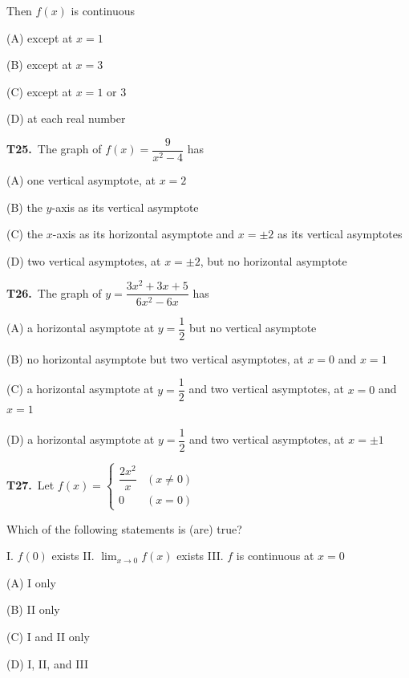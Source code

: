 \documentclass[11pt]{article}
\begin{document}
Then $f(x)$ is continuous
\begin{list}{}{\setlength{\leftmargin}{3em}\setlength{\labelwidth}{2.5em}\setlength{\itemsep}{0pt}\setlength{\topsep}{2pt}}
\item[(A)] except at $x = 1$
\item[(B)] except at $x = 3$
\item[(C)] except at $x = 1$ or $3$
\item[(D)] at each real number
\end{list}

\bigskip\noindent\textbf{T25.}\ The graph of $f(x) = \dfrac{9}{x^2-4}$ has
\begin{list}{}{\setlength{\leftmargin}{3em}\setlength{\labelwidth}{2.5em}\setlength{\itemsep}{0pt}\setlength{\topsep}{2pt}}
\item[(A)] one vertical asymptote, at $x = 2$
\item[(B)] the $y$-axis as its vertical asymptote
\item[(C)] the $x$-axis as its horizontal asymptote and $x = \pm 2$ as its vertical asymptotes
\item[(D)] two vertical asymptotes, at $x = \pm 2$, but no horizontal asymptote
\end{list}

\bigskip\noindent\textbf{T26.}\ The graph of $y = \dfrac{3x^2+3x+5}{6x^2-6x}$ has
\begin{list}{}{\setlength{\leftmargin}{3em}\setlength{\labelwidth}{2.5em}\setlength{\itemsep}{0pt}\setlength{\topsep}{2pt}}
\item[(A)] a horizontal asymptote at $y = \dfrac{1}{2}$ but no vertical asymptote
\item[(B)] no horizontal asymptote but two vertical asymptotes, at $x = 0$ and $x = 1$
\item[(C)] a horizontal asymptote at $y = \dfrac{1}{2}$ and two vertical asymptotes, at $x = 0$ and $x = 1$
\item[(D)] a horizontal asymptote at $y = \dfrac{1}{2}$ and two vertical asymptotes, at $x = \pm 1$
\end{list}

\bigskip\noindent\textbf{T27.}\ Let $f(x) = \begin{cases} \dfrac{2x^2}{x} & (x \neq 0) \\ 0 & (x = 0) \end{cases}$

Which of the following statements is (are) true?

I. $f(0)$ exists
II. $\displaystyle\lim_{x\to 0} f(x)$ exists
III. $f$ is continuous at $x = 0$
\begin{list}{}{\setlength{\leftmargin}{3em}\setlength{\labelwidth}{2.5em}\setlength{\itemsep}{0pt}\setlength{\topsep}{2pt}}
\item[(A)] I only
\item[(B)] II only
\item[(C)] I and II only
\item[(D)] I, II, and III
\end{list}
\end{document}
